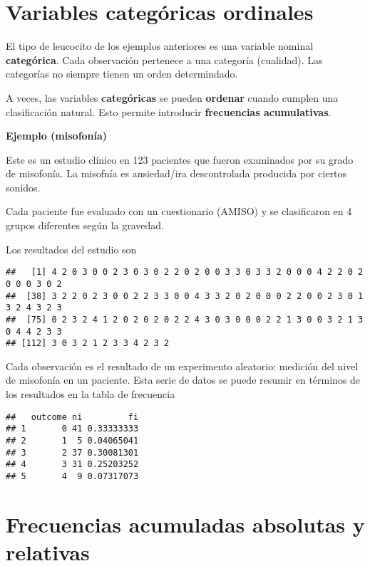 \documentclass[
]{book}
\begin{document}
\hypertarget{variables-categuxf3ricas-ordinales}{%
\section{Variables categóricas ordinales}\label{variables-categuxf3ricas-ordinales}}

El tipo de leucocito de los ejemplos anteriores es una variable nominal \textbf{categórica}. Cada observación pertenece a una categoría (cualidad). Las categorías no siempre tienen un orden determindado.

A veces, las variables \textbf{categóricas} se pueden \textbf{ordenar} cuando cumplen una clasificación natural. Esto permite introducir \textbf{frecuencias acumulativas}.

\textbf{Ejemplo (misofonía)}

Este es un estudio clínico en 123 pacientes que fueron examinados por su grado de misofonía. La misofnía es ansiedad/ira descontrolada producida por ciertos sonidos.

Cada paciente fue evaluado con un cuestionario (AMISO) y se clasificaron en 4 grupos diferentes según la gravedad.

Los resultados del estudio son

\begin{verbatim}
##   [1] 4 2 0 3 0 0 2 3 0 3 0 2 2 0 2 0 0 3 3 0 3 3 2 0 0 0 4 2 2 0 2 0 0 0 3 0 2
##  [38] 3 2 2 0 2 3 0 0 2 2 3 3 0 0 4 3 3 2 0 2 0 0 0 2 2 0 0 2 3 0 1 3 2 4 3 2 3
##  [75] 0 2 3 2 4 1 2 0 2 0 2 0 2 2 4 3 0 3 0 0 0 2 2 1 3 0 0 3 2 1 3 0 4 4 2 3 3
## [112] 3 0 3 2 1 2 3 3 4 2 3 2
\end{verbatim}

Cada observación es el resultado de un experimento aleatorio: medición del nivel de misofonía en un paciente. Esta serie de datos se puede resumir en términos de los resultados en la tabla de frecuencia

\begin{verbatim}
##   outcome ni         fi
## 1       0 41 0.33333333
## 2       1  5 0.04065041
## 3       2 37 0.30081301
## 4       3 31 0.25203252
## 5       4  9 0.07317073
\end{verbatim}

\hypertarget{frecuencias-acumuladas-absolutas-y-relativas}{%
\section{Frecuencias acumuladas absolutas y relativas}\label{frecuencias-acumuladas-absolutas-y-relativas}}
\end{document}
